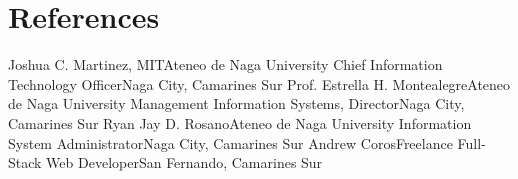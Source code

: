 \section{References}

\resumeSubHeadingListStart
    \resumeSubheading
    {Joshua C. Martinez, MIT}{Ateneo de Naga University}
    {Chief Information Technology Officer}{Naga City, Camarines Sur}
    \resumeItemListStart
    \resumeItemListEnd
    \resumeSubheading
    {Prof. Estrella H. Montealegre}{Ateneo de Naga University}
    {Management Information Systems, Director}{Naga City, Camarines Sur}
    \resumeItemListStart
    \resumeItemListEnd
    \resumeSubheading
    {Ryan Jay D. Rosano}{Ateneo de Naga University}
    {Information System Administrator}{Naga City, Camarines Sur}
    \resumeItemListStart
    \resumeItemListEnd
    \resumeSubheading
    {Andrew Coros}{Freelance}
    {Full-Stack Web Developer}{San Fernando, Camarines Sur}
    \resumeItemListStart
    \resumeItemListEnd
    \resumeSubHeadingListEnd